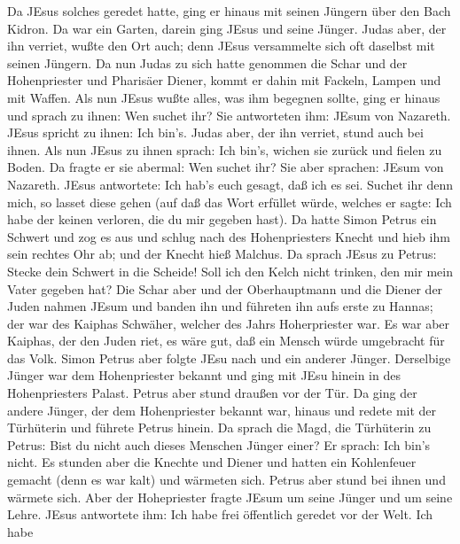  Da JEsus solches geredet hatte, ging er hinaus mit seinen
Jüngern über den Bach Kidron. Da war ein Garten, darein ging JEsus und
seine Jünger.  Judas aber, der ihn verriet, wußte den Ort
auch; denn JEsus versammelte sich oft daselbst mit seinen Jüngern.
 Da nun Judas zu sich hatte genommen die Schar und der
Hohenpriester und Pharisäer Diener, kommt er dahin mit Fackeln, Lampen
und mit Waffen.  Als nun JEsus wußte alles, was ihm begegnen
sollte, ging er hinaus und sprach zu ihnen: Wen suchet ihr? 
Sie antworteten ihm: JEsum von Nazareth. JEsus spricht zu ihnen: Ich
bin's. Judas aber, der ihn verriet, stund auch bei ihnen. 
Als nun JEsus zu ihnen sprach: Ich bin's, wichen sie zurück und fielen
zu Boden.  Da fragte er sie abermal: Wen suchet ihr? Sie
aber sprachen: JEsum von Nazareth.  JEsus antwortete: Ich
hab's euch gesagt, daß ich es sei. Suchet ihr denn mich, so lasset diese
gehen  (auf daß das Wort erfüllet würde, welches er sagte:
Ich habe der keinen verloren, die du mir gegeben hast).  Da
hatte Simon Petrus ein Schwert und zog es aus und schlug nach des
Hohenpriesters Knecht und hieb ihm sein rechtes Ohr ab; und der Knecht
hieß Malchus.  Da sprach JEsus zu Petrus: Stecke dein
Schwert in die Scheide! Soll ich den Kelch nicht trinken, den mir mein
Vater gegeben hat?  Die Schar aber und der Oberhauptmann
und die Diener der Juden nahmen JEsum und banden ihn  und
führeten ihn aufs erste zu Hannas; der war des Kaiphas Schwäher, welcher
des Jahrs Hoherpriester war.  Es war aber Kaiphas, der den
Juden riet, es wäre gut, daß ein Mensch würde umgebracht für das Volk.
 Simon Petrus aber folgte JEsu nach und ein anderer Jünger.
Derselbige Jünger war dem Hohenpriester bekannt und ging mit JEsu hinein
in des Hohenpriesters Palast.  Petrus aber stund draußen
vor der Tür. Da ging der andere Jünger, der dem Hohenpriester bekannt
war, hinaus und redete mit der Türhüterin und führete Petrus hinein.
 Da sprach die Magd, die Türhüterin zu Petrus: Bist du
nicht auch dieses Menschen Jünger einer? Er sprach: Ich bin's nicht.
 Es stunden aber die Knechte und Diener und hatten ein
Kohlenfeuer gemacht (denn es war kalt) und wärmeten sich. Petrus aber
stund bei ihnen und wärmete sich.  Aber der Hohepriester
fragte JEsum um seine Jünger und um seine Lehre.  JEsus
antwortete ihm: Ich habe frei öffentlich geredet vor der Welt. Ich habe
